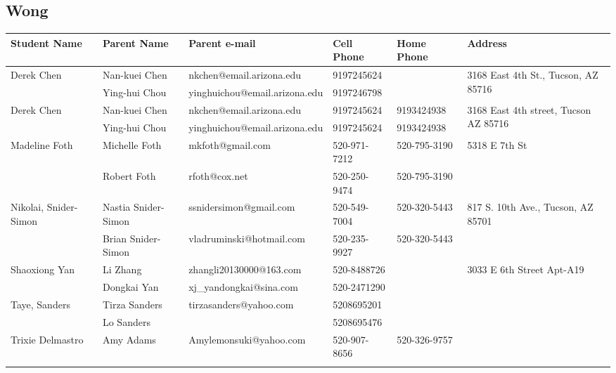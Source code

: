 \documentclass[landscape]{article}\usepackage[]{graphicx}\usepackage[]{color}
\begin{document}
\subsection{Wong}
\begin{longtable}{|p{100pt}|p{100pt}|p{140pt}|p{60pt}|p{64pt}|p{120pt}|}
\textbf{Student Name} & \textbf{Parent Name} & \textbf{Parent e-mail} & \textbf{Cell Phone} & \textbf{Home Phone} & \textbf{Address}\\
\hline
\hline
\multirow{2}{100pt}{Derek Chen} & Nan-kuei Chen & nkchen@email.arizona.edu & 9197245624 &  & \multirow{2}{120pt}{3168 East 4th St., Tucson, AZ 85716} \\
 & Ying-hui Chou & yinghuichou@email.arizona.edu & 9197246798 &  & \\
\hline
\multirow{2}{100pt}{Derek Chen} & Nan-kuei Chen & nkchen@email.arizona.edu & 9197245624 & 9193424938 & \multirow{2}{120pt}{3168 East 4th street, Tucson AZ 85716} \\
 & Ying-hui Chou & yinghuichou@email.arizona.edu & 9197245624 & 9193424938 & \\
\hline
\multirow{2}{100pt}{Madeline Foth} & Michelle Foth & mkfoth@gmail.com & 520-971-7212 & 520-795-3190 & \multirow{2}{120pt}{5318 E 7th St} \\
 & Robert Foth & rfoth@cox.net & 520-250-9474 & 520-795-3190 & \\
\hline
\multirow{2}{100pt}{Nikolai, Snider-Simon} & Nastia Snider-Simon & ssnidersimon@gmail.com & 520-549-7004 & 520-320-5443 & \multirow{2}{120pt}{817 S. 10th Ave., Tucson, AZ 85701} \\
 & Brian Snider-Simon & vladruminski@hotmail.com & 520-235-9927 & 520-320-5443 & \\
\hline
\multirow{2}{100pt}{Shaoxiong Yan} & Li Zhang & zhangli20130000@163.com & 520-8488726 &  & \multirow{2}{120pt}{3033 E 6th Street Apt-A19} \\
 & Dongkai Yan & xj\_yandongkai@sina.com & 520-2471290 &  & \\
\hline
\multirow{2}{100pt}{Taye, Sanders} & Tirza Sanders & tirzasanders@yahoo.com & 5208695201 &  & \multirow{2}{120pt}{} \\
 & Lo Sanders &  & 5208695476 &  & \\
\hline
\multirow{2}{100pt}{Trixie Delmastro } & Amy Adams & Amylemonsuki@yahoo.com & 520-907-8656 & 520-326-9757 & \multirow{2}{120pt}{} \\
 &  &  &  &  & \\
\hline
\end{longtable}
\newpage
\end{document}
